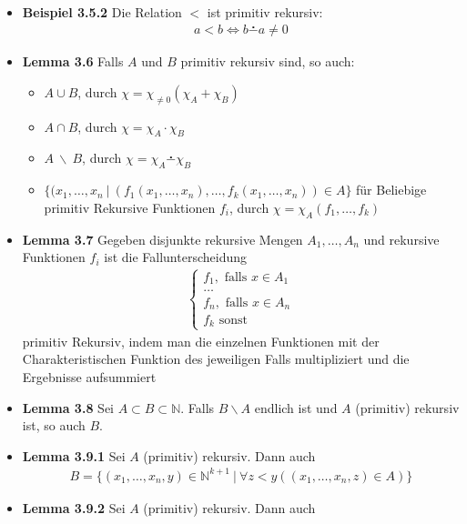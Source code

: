 \documentclass{scrartcl}
\newcommand{\dotminus}[0]{\overset{\centerdot}{-}}
\begin{document}
\begin{itemize}
\begin{align*}
    \end{align*}
    \item{\textbf{Beispiel 3.5.2}} Die Relation $<$ ist primitiv rekursiv:
    \begin{align*}
        a < b \Leftrightarrow  b \dotminus a \neq 0
    \end{align*}
    \item{\textbf{Lemma 3.6}} Falls $A$ und $B$ primitiv rekursiv sind, so auch:
    \begin{itemize}
        \item $A \cup B$, durch $\chi = \chi_{\neq 0}(\chi_A + \chi_B)$
        \item $A \cap B$, durch $\chi = \chi_A \cdot \chi_B$
        \item $A\ \backslash\ B$, durch $\chi = \chi_A \dotminus \chi_B$
        \item $\{(x_1, \hdots, x_n \ |\ (f_1(x_1, \hdots, x_n), \hdots, f_k(x_1, \hdots, x_n)) \in A\}$ für Beliebige primitiv Rekursive Funktionen $f_i$, durch $\chi = \chi_A(f_1, \hdots, f_k)$
    \end{itemize}
    \item{\textbf{Lemma 3.7}} Gegeben disjunkte rekursive Mengen $A_1, \hdots, A_n$ und rekursive Funktionen $f_i$ ist die Fallunterscheidung 
    \begin{align*}
        \begin{cases}
            f_1, \text{ falls } x \in A_1\\
            \hdots\\
            f_n, \text{ falls } x\in A_n\\
            f_k \text{ sonst}
        \end{cases}
    \end{align*}
    primitiv Rekursiv, indem man die einzelnen Funktionen mit der Charakteristischen Funktion des jeweiligen Falls multipliziert und die Ergebnisse aufsummiert
    \item{\textbf{Lemma 3.8}} Sei $A \subset B \subset \mathbb{N}$. Falls $B \backslash A$ endlich ist und $A$ (primitiv) rekursiv ist, so auch $B$.
    \item{\textbf{Lemma 3.9.1}} Sei $A$ (primitiv) rekursiv. Dann auch
    \begin{align*}
        B = \{(x_1, \hdots, x_n,y)\in \mathbb{N}^{k+1}\ |\ \forall z < y ((x_1, \hdots, x_n, z) \in A)\}
    \end{align*}
    \item{\textbf{Lemma 3.9.2}} Sei $A$ (primitiv) rekursiv. Dann auch

\end{itemize}
\end{document}
